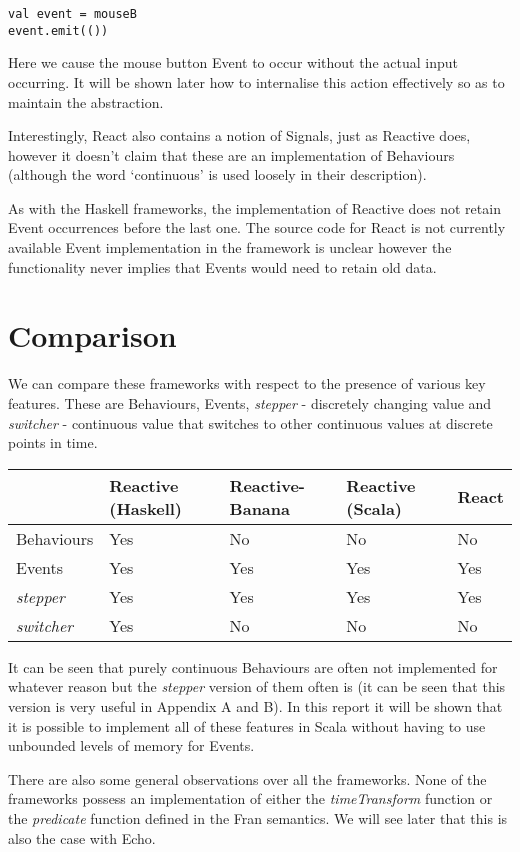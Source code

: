 \begin{verbatim}
val event = mouseB
event.emit(())
\end{verbatim}      

      Here we cause the mouse button Event to occur without the actual input occurring. It will be shown later how to     
      internalise this action effectively so as to maintain the abstraction. 

      Interestingly, React also contains a notion of Signals, just as Reactive does, 
      however it doesn't claim that these are an implementation of Behaviours (although the word `continuous' is
      used loosely in their description). 
      
      As with the Haskell frameworks, the implementation of Reactive does not retain Event occurrences before the
      last one. The source code for React is not currently available Event implementation in the framework is unclear
      however the functionality never implies that Events would need to retain old data.
      
\section{Comparison}
  We can compare these frameworks with respect to the presence of various key features. These are Behaviours, Events, 
  \emph{stepper} - discretely 
  changing value and \emph{switcher} - continuous value that switches to other continuous values at discrete points in time.
  
  \begin{center}
     \begin{tabular}{ | l | l | l | l | l | }
       \hline
        & Reactive (Haskell) & Reactive-Banana & Reactive (Scala) & React \\ \hline \hline
       Behaviours & Yes & No & No & No \\ \hline
       Events & Yes & Yes & Yes & Yes \\ \hline
       \emph{stepper} & Yes & Yes & Yes & Yes \\ \hline
       \emph{switcher} & Yes & No & No & No \\ \hline  
       \hline
     \end{tabular}
   \end{center}
   
   It can be seen that purely continuous Behaviours are often not implemented for whatever reason
   but the \emph{stepper} version
   of them often is (it can be seen that this version is very useful in Appendix A and B). In this report it will
   be shown that it is possible to implement all of these features in Scala without having to use unbounded levels
   of memory for Events.
   
   There are also some general observations over all the frameworks. None of the frameworks possess an
   implementation of either the \emph{timeTransform} function or the \emph{predicate} function defined 
   in the Fran semantics. We will see later that this is also the case with Echo. 